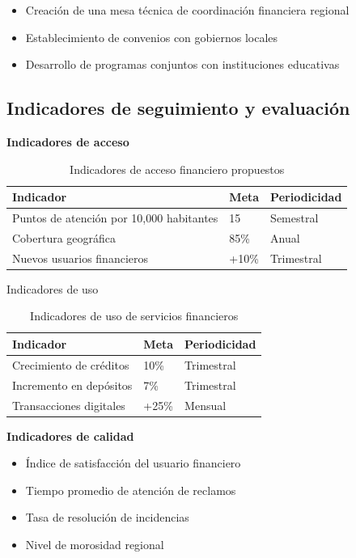 \documentclass[12pt, a4paper]{article}
\begin{document}
\begin{itemize}
    \item Creación de una mesa técnica de coordinación financiera regional
    \item Establecimiento de convenios con gobiernos locales
    \item Desarrollo de programas conjuntos con instituciones educativas
\end{itemize}

\subsection{Indicadores de seguimiento y evaluación}

\textbf{Indicadores de acceso}

\begin{table}[ht]
\centering
\begin{tabular}{|l|l|l|}
\hline
\textbf{Indicador} & \textbf{Meta} & \textbf{Periodicidad} \\
\hline
Puntos de atención por 10,000 habitantes & 15 & Semestral \\
Cobertura geográfica & 85\% & Anual \\
Nuevos usuarios financieros & +10\% & Trimestral \\
\hline
\end{tabular}
\caption{Indicadores de acceso financiero propuestos}
\label{tab:indicadores_acceso}
\end{table}

\textbf{}{Indicadores de uso}

\begin{table}[ht]
\centering
\begin{tabular}{|l|l|l|}
\hline
\textbf{Indicador} & \textbf{Meta} & \textbf{Periodicidad} \\
\hline
Crecimiento de créditos & 10\% & Trimestral \\
Incremento en depósitos & 7\% & Trimestral \\
Transacciones digitales & +25\% & Mensual \\
\hline
\end{tabular}
\caption{Indicadores de uso de servicios financieros}
\label{tab:indicadores_uso}
\end{table}

\textbf{Indicadores de calidad}

\begin{itemize}
    \item Índice de satisfacción del usuario financiero
    \item Tiempo promedio de atención de reclamos
    \item Tasa de resolución de incidencias
    \item Nivel de morosidad regional
\end{itemize}
\end{document}
